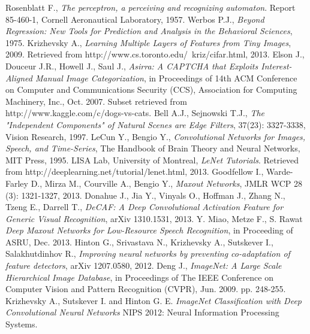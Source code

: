 \documentclass[journal]{IEEEtran}
\begin{document}
\begin{thebibliography}{1}
Rosenblatt F., \emph{The perceptron, a perceiving and recognizing automaton}. 
Report 85-460-1, Cornell Aeronautical Laboratory, 1957.
Werbos P.J., \emph{Beyond Regression: New Tools for Prediction and Analysis 
in the Behavioral Sciences}, 1975.
Krizhevsky A., \emph{Learning Multiple Layers of Features from Tiny Images},
2009. Retrieved from http://www.cs.toronto.edu/~kriz/cifar.html, 2013.
Elson J., Douceur J.R., Howell  J., Saul J., \emph{Asirra: A CAPTCHA 
that Exploits Interest-Aligned Manual Image Categorization}, in 
Proceedings of 14th ACM Conference on Computer and Communications Security 
(CCS), Association for Computing Machinery, Inc., Oct. 2007.
Subset retrieved from http://www.kaggle.com/c/dogs-vs-cats. 
Bell A.J., Sejnowski T.J., \emph{The "Independent Components" of Natural Scenes
are Edge Filters}, 37(23): 3327-3338, Vision Research, 1997.
LeCun Y., Bengio Y., \emph{Convolutional Networks for Images, Speech, 
and Time-Series}, The Handbook of Brain Theory and Neural Networks, MIT Press, 
1995.
LISA Lab, University of Montreal, \emph{LeNet Tutorials}. Retrieved from 
http://deeplearning.net/tutorial/lenet.html, 2013.
Goodfellow I., Warde-Farley D., Mirza M., Courville A., Bengio Y., 
\emph{Maxout Networks}, JMLR WCP 28 (3): 1321-1327, 2013.
Donahue J., Jia Y., Vinyals O., Hoffman J., Zhang N., Tzeng E., Darrell T., 
\emph{DeCAF: A Deep Convolutional Activation Feature for Generic 
Visual Recognition}, arXiv 1310.1531, 2013.
Y. Miao, Metze F., S. Rawat \emph{Deep Maxout Networks for Low-Resource Speech Recognition}, in 
Proceeding of ASRU, Dec. 2013.
Hinton G., Srivastava N., Krizhevsky A., Sutskever I., Salakhutdinhov R., 
\emph{Improving neural networks by preventing co-adaptation of feature
detectors}, arXiv 1207.0580, 2012.
Deng J., \emph{ImageNet: A Large Scale Hierarchical Image Database},
in Proceedings of The IEEE Conference on Computer Vision and Pattern 
Recognition (CVPR), Jun. 2009. pp. 248-255.
Krizhevsky A., Sutskever I. and Hinton G. E.
\emph{ImageNet Classification with Deep Convolutional Neural Networks}
NIPS 2012: Neural Information Processing Systems.
\end{thebibliography}




\enlargethispage{-5in}
\end{document}
